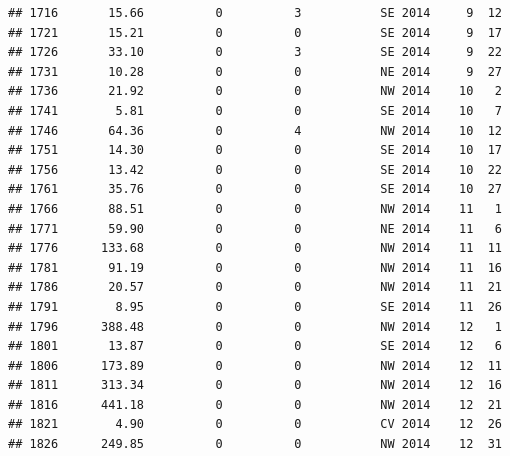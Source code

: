 \documentclass[
]{article}
\begin{document}
\begin{verbatim}
## 1716       15.66          0          3           SE 2014     9  12
## 1721       15.21          0          0           SE 2014     9  17
## 1726       33.10          0          3           SE 2014     9  22
## 1731       10.28          0          0           NE 2014     9  27
## 1736       21.92          0          0           NW 2014    10   2
## 1741        5.81          0          0           SE 2014    10   7
## 1746       64.36          0          4           NW 2014    10  12
## 1751       14.30          0          0           SE 2014    10  17
## 1756       13.42          0          0           SE 2014    10  22
## 1761       35.76          0          0           SE 2014    10  27
## 1766       88.51          0          0           NW 2014    11   1
## 1771       59.90          0          0           NE 2014    11   6
## 1776      133.68          0          0           NW 2014    11  11
## 1781       91.19          0          0           NW 2014    11  16
## 1786       20.57          0          0           NW 2014    11  21
## 1791        8.95          0          0           SE 2014    11  26
## 1796      388.48          0          0           NW 2014    12   1
## 1801       13.87          0          0           SE 2014    12   6
## 1806      173.89          0          0           NW 2014    12  11
## 1811      313.34          0          0           NW 2014    12  16
## 1816      441.18          0          0           NW 2014    12  21
## 1821        4.90          0          0           CV 2014    12  26
## 1826      249.85          0          0           NW 2014    12  31
\end{verbatim}
\end{document}
